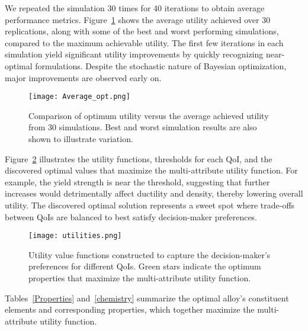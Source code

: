 \documentclass[final,5p,times,twocolumn]{elsarticle}
\begin{document}
We repeated the simulation 30 times for 40 iterations to obtain average performance metrics. Figure~\ref{average} shows the average utility achieved over 30 replications, along with some of the best and worst performing simulations, compared to the maximum achievable utility. The first few iterations in each simulation yield significant utility improvements by quickly recognizing near-optimal formulations. Despite the stochastic nature of Bayesian optimization, major improvements are observed early on.

\begin{figure}[htb!]
\centering
\texttt{[image: Average\_opt.png]}
\caption{Comparison of optimum utility versus the average achieved utility from 30 simulations. Best and worst simulation results are also shown to illustrate variation.}
\label{average}
\end{figure}

Figure~\ref{utils} illustrates the utility functions, thresholds for each QoI, and the discovered optimal values that maximize the multi-attribute utility function. For example, the yield strength is near the threshold, suggesting that further increases would detrimentally affect ductility and density, thereby lowering overall utility. The discovered optimal solution represents a sweet spot where trade-offs between QoIs are balanced to best satisfy decision-maker preferences.

\begin{figure}[htb!]
\centering
\texttt{[image: utilities.png]}
\caption{Utility value functions constructed to capture the decision-maker's preferences for different QoIs. Green stars indicate the optimum properties that maximize the multi-attribute utility function.}
\label{utils}
\end{figure}

Tables~\ref{Properties} and~\ref{chemistry} summarize the optimal alloy's constituent elements and corresponding properties, which together maximize the multi-attribute utility function.

\end{document}
